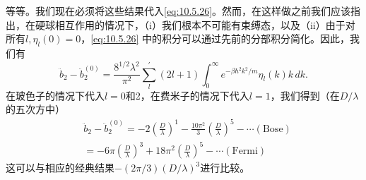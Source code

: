 等等。我们现在必须将这些结果代入\autoref{eq:10.5.26}。然而，在这样做之前我们应该指出，在硬球相互作用的情况下，（i）我们根本不可能有束缚态，以及（ii）由于对所有\(l, \eta_l(0) = 0\)，\autoref{eq:10.5.26} 中的积分可以通过先前的分部积分简化。因此，我们有
\begin{equation}\tag{10.5.36}\label{eq:10.5.36}
\ddot { b } _ { 2 } - \ddot { b } _ { 2 } ^{( 0 )} = \frac { 8 ^{1 / 2} \lambda ^{2} } { \pi ^{2} } \sum _ { l } ^{\prime} ( 2 l + 1 ) \int _ { 0 } ^{\infty} e ^{- \beta \hbar ^ { 2} k ^{2} / m } \eta _ { l } ( k ) k \, d k .
\end{equation}
在玻色子的情况下代入\(l=0\)和2，在费米子的情况下代入\(l=1\)，我们得到（在\(D/\lambda\)的五次方中）
\begin{equation}\tag{10.5.37}\label{eq:10.5.37}
\begin{array}{rl} & { \ddot { b } _ { 2 } - \ddot { b } _ { 2 } ^{( 0 )} = - 2 \left( \frac { D } { \lambda } \right) ^{1} - \frac { 10 \pi ^{2} } { 3 } \left( \frac { D } { \lambda } \right) ^{5} - \cdots  \mathrm { ( B o s e ) } } \\& {  = - 6 \pi \left( \frac { D } { \lambda } \right) ^{3} + 18 \pi ^{2} \left( \frac { D } { \lambda } \right) ^{5} - \cdots  \mathrm { ( F e r m i ) } } \end{array}
\end{equation}
这可以与相应的经典结果\(-(2\pi/3)(D/\lambda)^3\)进行比较。
